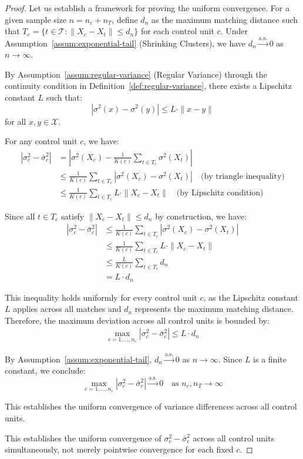 \documentclass[10pt,a4paper]{amsart}
\begin{document}
\begin{proof}
Let us establish a framework for proving the uniform convergence. For a given sample size $n = n_c + n_T$, define $d_n$ as the maximum matching distance such that $T_c = \{t \in \mathcal{T}: \|X_c - X_t\| \leq d_n\}$ for each control unit $c$. Under Assumption~\ref{assum:exponential-tail} (Shrinking Clusters), we have $d_n \xrightarrow{\text{a.s.}} 0$ as $n \to \infty$.

By Assumption~\ref{assum:regular-variance} (Regular Variance) through the continuity condition in Definition~\ref{def:regular-variance}, there exists a Lipschitz constant $L$ such that:
\begin{equation}
|\sigma^2(x) - \sigma^2(y)| \leq L \cdot \|x - y\|
\end{equation}
for all $x, y \in \mathcal{X}$.

For any control unit $c$, we have:
\begin{align*}
|\sigma_c^2 - \bar{\sigma}_c^2| &= \left|\sigma^2(X_c) - \frac{1}{K(c)}\sum_{t \in T_c}\sigma^2(X_t)\right| \\
&\leq \frac{1}{K(c)}\sum_{t \in T_c}|\sigma^2(X_c) - \sigma^2(X_t)| \quad \text{(by triangle inequality)} \\
&\leq \frac{1}{K(c)}\sum_{t \in T_c}L \cdot \|X_c - X_t\| \quad \text{(by Lipschitz condition)}
\end{align*}

Since all $t \in T_c$ satisfy $\|X_c - X_t\| \leq d_n$ by construction, we have:
\begin{align*}
|\sigma_c^2 - \bar{\sigma}_c^2| &\leq \frac{1}{K(c)}\sum_{t \in T_c}|\sigma^2(X_c) - \sigma^2(X_t)| \\
&\leq \frac{1}{K(c)}\sum_{t \in T_c}L \cdot \|X_c - X_t\| \\
&\leq \frac{L}{K(c)}\sum_{t \in T_c} d_n \\
&= L \cdot d_n
\end{align*}

This inequality holds uniformly for every control unit $c$, as the Lipschitz constant $L$ applies across all matches and $d_n$ represents the maximum matching distance. Therefore, the maximum deviation across all control units is bounded by:
\begin{align*}
\max_{c=1,\ldots,n_c}|\sigma_c^2 - \bar{\sigma}_c^2| \leq L \cdot d_n
\end{align*}

By Assumption~\ref{assum:exponential-tail}, $d_n \xrightarrow{\text{a.s.}} 0$ as $n \to \infty$. Since $L$ is a finite constant, we conclude:
\begin{equation}
\max_{c=1,\ldots,n_c}|\sigma_c^2 - \bar{\sigma}_c^2| \xrightarrow{\text{a.s.}} 0 \quad \text{as } n_c, n_T \to \infty
\end{equation}

This establishes the uniform convergence of variance differences across all control units.

This establishes the uniform convergence of $\sigma_c^2 - \bar{\sigma}_c^2$ across all control units simultaneously, not merely pointwise convergence for each fixed $c$.
\end{proof}
\end{document}
